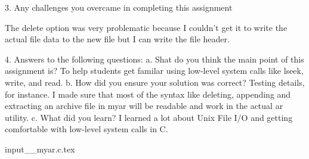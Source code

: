 \documentclass[letterpaper,10pt,titlepage]{article}
\begin{document}
\newline

3. Any challenges you overcame in completing this assignment\newline
\newline

The delete option was very problematic because I couldn't get it to write the actual file data to the new file but I can write the file header. \newline

4. Answers to the following questions:\newline
a. Shat do you think the main point of this assignment is?\newline
\newline
To help students get familar using low-level system calls like lseek, write, and read.\newline
\newline
b. How did you ensure your solution was correct? Testing details, for instance.\newline
\newline
I made sure that most of the syntax like deleting, appending and extracting an archive file in myar will be readable and work in the actual ar utility.\newline
\newline
c. What did you learn?\newline
\newline
I learned a lot about Unix File I/O and getting comfortable with low-level system calls in C.\newline




input{__myar.c.tex}
\end{document}
